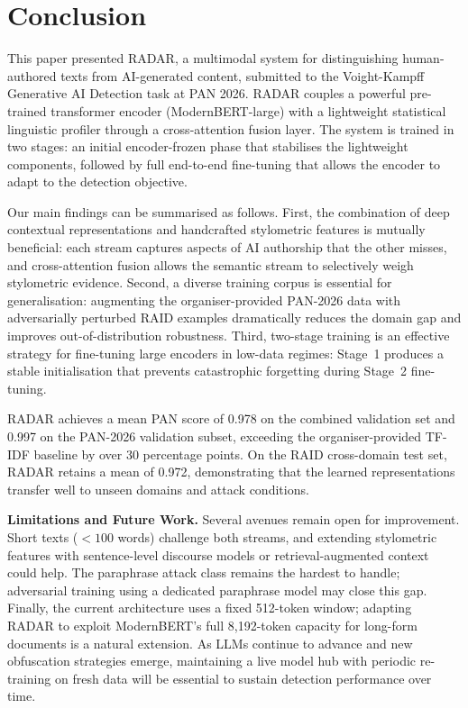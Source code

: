 
\section{Conclusion}
\label{sec:conclusion}

This paper presented RADAR, a multimodal system for distinguishing human-authored texts from AI-generated content, submitted to the Voight-Kampff Generative AI Detection task at PAN 2026. RADAR couples a powerful pre-trained transformer encoder (ModernBERT-large) with a lightweight statistical linguistic profiler through a cross-attention fusion layer. The system is trained in two stages: an initial encoder-frozen phase that stabilises the lightweight components, followed by full end-to-end fine-tuning that allows the encoder to adapt to the detection objective.

Our main findings can be summarised as follows. First, the combination of deep contextual representations and handcrafted stylometric features is mutually beneficial: each stream captures aspects of AI authorship that the other misses, and cross-attention fusion allows the semantic stream to selectively weigh stylometric evidence. Second, a diverse training corpus is essential for generalisation: augmenting the organiser-provided PAN-2026 data with adversarially perturbed RAID examples dramatically reduces the domain gap and improves out-of-distribution robustness. Third, two-stage training is an effective strategy for fine-tuning large encoders in low-data regimes: Stage~1 produces a stable initialisation that prevents catastrophic forgetting during Stage~2 fine-tuning.

RADAR achieves a mean PAN score of 0.978 on the combined validation set and 0.997 on the PAN-2026 validation subset, exceeding the organiser-provided TF-IDF baseline by over 30 percentage points. On the RAID cross-domain test set, RADAR retains a mean of 0.972, demonstrating that the learned representations transfer well to unseen domains and attack conditions.

\textbf{Limitations and Future Work.} Several avenues remain open for improvement. Short texts ($< 100$ words) challenge both streams, and extending stylometric features with sentence-level discourse models or retrieval-augmented context could help. The paraphrase attack class remains the hardest to handle; adversarial training using a dedicated paraphrase model may close this gap. Finally, the current architecture uses a fixed 512-token window; adapting RADAR to exploit ModernBERT's full 8,192-token capacity for long-form documents is a natural extension. As LLMs continue to advance and new obfuscation strategies emerge, maintaining a live model hub with periodic re-training on fresh data will be essential to sustain detection performance over time.

